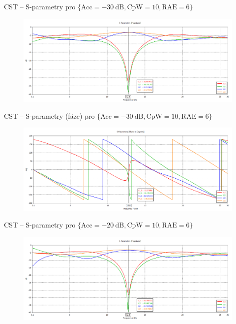\documentclass[aspectratio=169, 11pt, hyperref={unicode}]{beamer}
\begin{document}
\begin{frame}{CST -- S-parametry pro $\{\text{Acc} = -30\ \text{dB}, \text{CpW} = 10, \text{RAE} = 6\}$}
	\begin{figure}[!ht]
		\centering
		\includegraphics[width=.8\textwidth]{src/CST_S-Parameters_30dB_10-cpw_6-cntm.png}
	\end{figure}
\end{frame}
\begin{frame}{CST -- S-parametry (fáze) pro $\{\text{Acc} = -30\ \text{dB}, \text{CpW} = 10, \text{RAE} = 6\}$}
	\begin{figure}[!ht]
		\centering
		\includegraphics[width=.8\textwidth]{src/CST_S-Parameters_phase_30dB_10-cpw_6-cntm.png}
	\end{figure}
\end{frame}
\begin{frame}{CST -- S-parametry pro $\{\text{Acc} = -20\ \text{dB}, \text{CpW} = 10, \text{RAE} = 6\}$}
	\begin{figure}[!ht]
		\centering
		\includegraphics[width=.8\textwidth]{src/CST_S-Parameters_20dB_10-cpw_6-cntm.png}
	\end{figure}
\end{frame}
\end{document}
